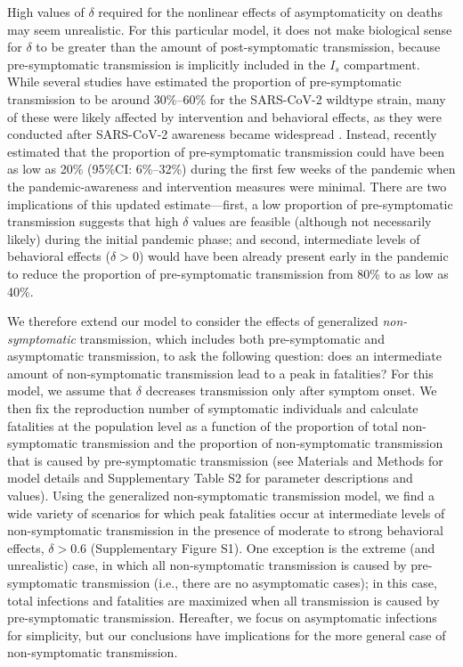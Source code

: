 \documentclass[12pt]{article}
\begin{document}
High values of $\delta$ required for the nonlinear effects of asymptomaticity on deaths may seem unrealistic.
For this particular model, it does not make biological sense for $\delta$ to be greater than the amount of post-symptomatic transmission, because pre-symptomatic transmission is implicitly included in the $I_s$ compartment.
While several studies have estimated the proportion of pre-symptomatic transmission to be around 30\%--60\% for the SARS-CoV-2 wildtype strain, many of these were likely affected by intervention and behavioral effects, as they were conducted after SARS-CoV-2 awareness became widespread \citep{he2020temporal}.
Instead, \cite{sender2021unmitigated} recently estimated that the proportion of pre-symptomatic transmission could have been as low as 20\% (95\%CI: 6\%--32\%) during the first few weeks of the pandemic when the pandemic-awareness and intervention measures were minimal.
There are two implications of this updated estimate---first, a low proportion of pre-symptomatic transmission suggests that high $\delta$ values are feasible (although not necessarily likely) during the initial pandemic phase; and second, intermediate levels of behavioral effects ($\delta > 0$) would have been already present early in the pandemic to reduce the proportion of pre-symptomatic transmission from 80\% to as low as 40\%.

We therefore extend our model to consider the effects of generalized \textit{non-symptomatic} transmission, which includes both pre-symptomatic and asymptomatic transmission, to ask the following question:
does an intermediate amount of non-symptomatic transmission lead to a peak in fatalities?
For this model, we assume that $\delta$ decreases transmission only after symptom onset.
We then fix the reproduction number of symptomatic individuals and calculate fatalities at the population level as a function of the proportion of total non-symptomatic transmission and the proportion of non-symptomatic transmission that is caused by pre-symptomatic transmission (see Materials and Methods for model details and Supplementary Table S2 for parameter descriptions and values).
Using the generalized non-symptomatic transmission model, we find a wide variety of scenarios for which peak fatalities occur at intermediate levels of non-symptomatic transmission in the presence of moderate to strong behavioral effects, $\delta > 0.6$ (Supplementary Figure S1).
One exception is the extreme (and unrealistic) case, in which all non-symptomatic transmission is caused by pre-symptomatic transmission (i.e., there are no asymptomatic cases);
in this case, total infections and fatalities are maximized when all transmission is caused by pre-symptomatic transmission. 
Hereafter, we focus on asymptomatic infections for simplicity, but our conclusions have implications for the more general case of non-symptomatic transmission.
\end{document}
